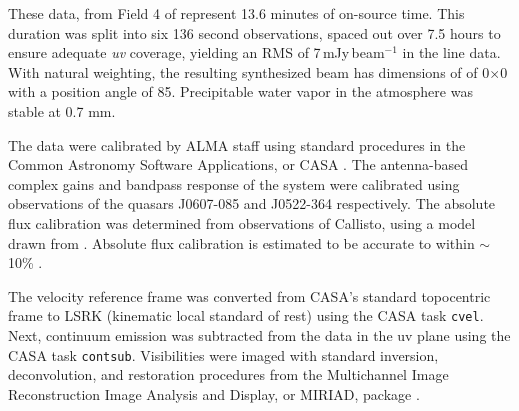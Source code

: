



These data, from Field 4 of \citet{Mann2014} represent 13.6 minutes of on-source time. This duration was split into six 136 second observations, spaced out over 7.5 hours to ensure adequate \textit{uv} coverage, yielding an RMS of 7\,mJy\,beam$^{-1}$ in the line data. With natural weighting, the resulting synthesized beam has dimensions of of 0$\times$0 with a position angle of 85\degree. Precipitable water vapor in the atmosphere was stable at 0.7 mm.


The data were calibrated by ALMA staff using standard procedures in the Common Astronomy Software Applications, or CASA \citep{McMullin2007}. The antenna-based complex gains and bandpass response of the system were calibrated using observations of the quasars J0607-085 and J0522-364 respectively. The absolute flux calibration was determined from observations of Callisto, using a model drawn from \citet{Butler2012}. Absolute flux calibration is estimated to be accurate to within $\sim$10\% \citep{Mann2014}.



The velocity reference frame was converted from CASA's standard topocentric frame to LSRK (kinematic local standard of rest) using the CASA task \texttt{cvel}. Next, continuum emission was subtracted from the data in the uv plane using the CASA task \texttt{contsub}. Visibilities were imaged with standard inversion, deconvolution, and restoration procedures from the Multichannel Image Reconstruction Image Analysis and Display, or MIRIAD, package \citep{Sault1995}.
